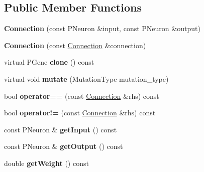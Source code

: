\subsection*{Public Member Functions}
\begin{DoxyCompactItemize}
\item 
{\bfseries Connection} (const P\+Neuron \&input, const P\+Neuron \&output)\hypertarget{classConnection_a7f8d1ee42429739840f51e29291b14ff}{}\label{classConnection_a7f8d1ee42429739840f51e29291b14ff}

\item 
{\bfseries Connection} (const \hyperlink{classConnection}{Connection} \&connection)\hypertarget{classConnection_a543917dbba5f7633ae525bb06f66ae0b}{}\label{classConnection_a543917dbba5f7633ae525bb06f66ae0b}

\item 
virtual P\+Gene {\bfseries clone} () const \hypertarget{classConnection_a6c256435c0b134c6aa3756f576d1a80b}{}\label{classConnection_a6c256435c0b134c6aa3756f576d1a80b}

\item 
virtual void {\bfseries mutate} (Mutation\+Type mutation\+\_\+type)\hypertarget{classConnection_ab5a3ec19262bfa15dd52ee2130ffb730}{}\label{classConnection_ab5a3ec19262bfa15dd52ee2130ffb730}

\item 
bool {\bfseries operator==} (const \hyperlink{classConnection}{Connection} \&rhs) const \hypertarget{classConnection_aab41089321047bf9f04fe3a39ec44794}{}\label{classConnection_aab41089321047bf9f04fe3a39ec44794}

\item 
bool {\bfseries operator!=} (const \hyperlink{classConnection}{Connection} \&rhs) const \hypertarget{classConnection_a8ec11ec71856e09d103fed48403cf403}{}\label{classConnection_a8ec11ec71856e09d103fed48403cf403}

\item 
const P\+Neuron \& {\bfseries get\+Input} () const \hypertarget{classConnection_a4b0e00cbd27df2acca18f7658c0b148a}{}\label{classConnection_a4b0e00cbd27df2acca18f7658c0b148a}

\item 
const P\+Neuron \& {\bfseries get\+Output} () const \hypertarget{classConnection_ad67bbab3d9091f1f9520ae6c50404403}{}\label{classConnection_ad67bbab3d9091f1f9520ae6c50404403}

\item 
double {\bfseries get\+Weight} () const \hypertarget{classConnection_a32c8c2b7d73cccb3a9ee6baf86973ee6}{}\label{classConnection_a32c8c2b7d73cccb3a9ee6baf86973ee6}

\end{DoxyCompactItemize}
